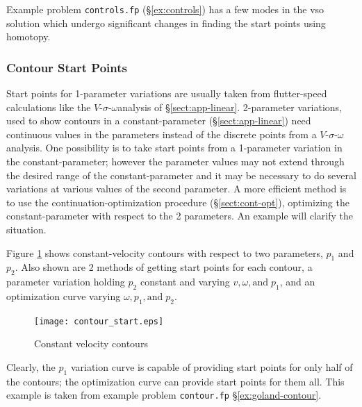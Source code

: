 \documentclass[11pt,openany,twoside]{book}
\numberwithin{equation}{section}		%
\newcommand{\Code}[1]{{\small\tt #1}}
\newcommand{\VSO}{$V$-$\sigma$-$\omega$\:}
\newcommand{\Sectref}[1]{\S\ref{#1}}
\begin{document}

Example problem \Code{controls.fp} (\Sectref{ex:controls}) has a few
modes in the vso solution which undergo significant changes in finding
the start points using homotopy.

\subsubsection{Contour Start Points}
Start points for 1-parameter variations are usually taken from flutter-speed
calculations like the \VSO analysis of \Sectref{sect:app-linear}.
2-parameter variations, used to show contours in a constant-parameter
(\Sectref{sect:app-linear})
need continuous values in the parameters instead of the discrete points from
a \VSO analysis. One possibility is to take start points from a 1-parameter
variation in the constant-parameter;
however the parameter values may not extend through the desired
range of the constant-parameter and it may be necessary to do several
variations at various values of the second parameter.
A more efficient method is to use the
continuation-optimization procedure (\Sectref{sect:cont-opt}),
optimizing the constant-parameter with respect to the 2 parameters.
An example will clarify the situation.

Figure \ref{fig:contour-start} shows constant-velocity contours with respect
to two parameters, $p_1$ and $p_2$.
Also shown are 2 methods of getting start points for each contour, a parameter
variation holding $p_2$ constant and varying $v, \omega, \text{and}\;p_1$,
and an optimization curve varying $\omega, p_1, \text{and}\;p_2$.
\begin{figure}[ht] 	%
		\texttt{[image: contour\_start.eps]}
	\centering
	\caption{Constant velocity contours}\label{fig:contour-start}
\end{figure}
Clearly, the $p_1$ variation
curve is capable of providing start points for only half of the contours;
the optimization curve can provide start points for them all.
This example is taken from example problem \Code{contour.fp} \Sectref{ex:goland-contour}.
\end{document}
